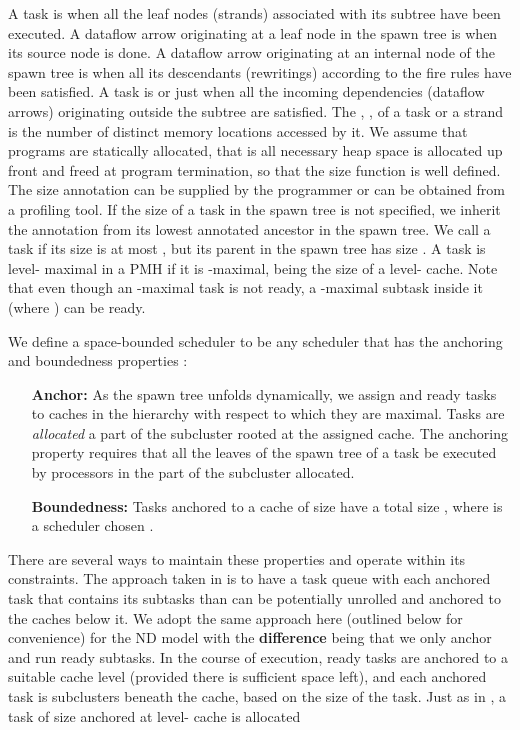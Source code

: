 A task is  when all the leaf nodes (strands) associated with
its subtree have been executed.  A dataflow arrow originating at a leaf
node in the spawn tree is  when its source node is done.
A dataflow arrow originating at an internal node of the spawn tree is
 when all its descendants (rewritings) according to the
fire rules have been satisfied.  
A task is  or just  when all the
incoming dependencies (dataflow arrows) originating outside the
subtree are satisfied.  The , , of a task or a
strand is the number of distinct memory locations accessed by it.  We
assume that programs are statically allocated, that is all necessary
heap space is allocated up front and freed at program termination, so
that the size function is well defined. The size annotation can be
supplied by the programmer or can be obtained from a profiling
tool. If the size of a task in the spawn tree is not specified, we
inherit the annotation from its lowest annotated ancestor in the spawn
tree. We call a task  if its size is at most ,
but its parent in the spawn tree has size . A task is level-
maximal in a PMH if it is -maximal,  being the size of a
level- cache. Note that even though an -maximal task is not
ready, a -maximal subtask inside it (where ) can be ready.

\vspace{1ex}
We define a space-bounded scheduler to be any scheduler that has the
anchoring and boundedness properties \cite{SimhadriBlFi15}:
\begin{itemize}
\item[\textbf{Anchor:}]
As the spawn tree unfolds dynamically, we assign and 
ready tasks to caches in the hierarchy with respect to which they are
maximal.  Tasks are \textit{allocated} a part of the subcluster rooted
at the assigned cache. The anchoring property requires that all the
leaves of the spawn tree of a task be executed by processors in the
part of the subcluster allocated.
\item[\textbf{Boundedness:}]
 Tasks anchored to a cache of size  have a total size ,
where  is a scheduler chosen .
\end{itemize}

There are several ways to maintain these properties and operate within
its constraints. The approach taken in \cite{BlellochFiGi11} is to
have a task queue with each anchored task that contains its subtasks
than can be potentially unrolled and anchored to the caches below it.
We adopt the same approach here (outlined below for convenience) for
the ND model with the \textbf{difference} being that we only anchor
and run ready subtasks. In the course of execution, ready tasks are
anchored to a suitable cache level (provided there is sufficient space
left), and each anchored task is  subclusters beneath
the cache, based on the size of the task. Just as
in \cite{BlellochFiGi11}, a task of size  anchored at level-
cache is allocated
 
